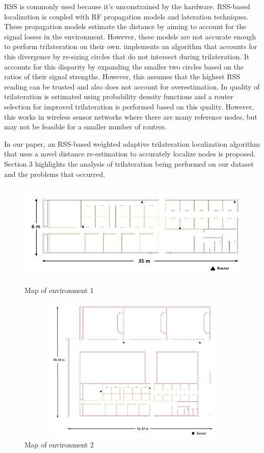 \documentclass[twocolumn]{svjour3}
\begin{document}
RSS is commonly used because it’s unconstrained by the hardware. RSS-based \citep*{RSSI_Analysis,Analysis_RSSI} localization is coupled with RF propagation models and lateration techniques. These propagation models estimate the distance by aiming to account for the signal losses in the environment. However, these models are not accurate enough to perform trilateration on their own.
\citep*{DCE} implements an algorithm that accounts for this divergence by re-sizing circles that do not intersect during trilateration. It accounts for this disparity by expanding the smaller two circles based on the ratios of their signal strengths. However, this assumes that the highest RSS reading can be trusted and also does not account for overestimation. 
In \citep*{5066966} quality of trilateration is estimated using probability density functions and a router selection for improved trilateration is performed based on this quality. However, this works in wireless sensor networks where there are many reference nodes, but may not be feasible for a smaller number of routers. 

In our paper, an RSS-based weighted adaptive trilateration localization algorithm that uses a novel distance re-estimation to accurately localize nodes is proposed. Section 3 highlights the analysis of trilateration being performed on our dataset and the problems that occurred. 

\begin{figure}[!ht]
\centering
\includegraphics[width=135mm,height=50mm]{environment1.jpg}
\caption{Map of environment 1}
\label{fig:tenv1}
\end{figure}

\begin{figure}[!ht]
\centering
\includegraphics[width=135mm,height=70mm]{temp.PNG}
\caption{Map of environment 2}
\label{fig:tenv2}
\end{figure}
\end{document}
